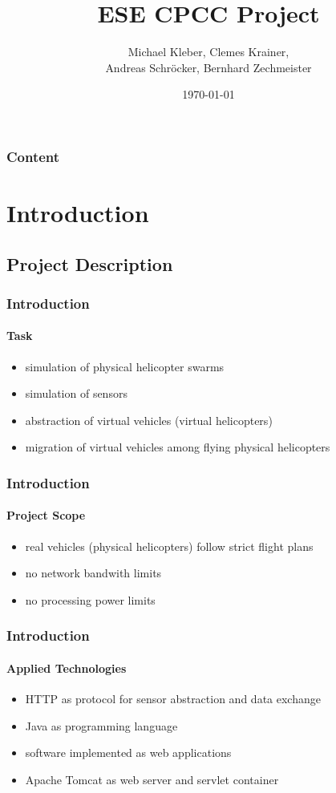 \documentclass{beamer}
\title{ESE CPCC Project}
\author[M. Kleber, C. Krainer, A. Schr\"ocker, B. Zechmeister]{Michael Kleber, Clemes Krainer,\\ Andreas Schr\"ocker, Bernhard Zechmeister}
\institute[University of Salzburg]
{
Department of Computer Sciences\\
  University of Salzburg, Austria
}
\date{\today}
\begin{document}
\begin{frame}
	\titlepage
\end{frame}

\begin{frame}
	\frametitle{Content}
	\tableofcontents
\end{frame}


\section{Introduction}

\subsection{Project Description}

\begin{frame}\frametitle{Introduction}\framesubtitle{Task}
	\begin{itemize}
		\item simulation of physical helicopter swarms
		\item simulation of sensors
		\item abstraction of virtual vehicles (virtual helicopters)
		\item migration of virtual vehicles among flying physical helicopters
	\end{itemize} 
\end{frame}

\begin{frame}\frametitle{Introduction}\framesubtitle{Project Scope}
	\begin{itemize}
		\item real vehicles (physical helicopters) follow strict flight plans
		\item no network bandwith limits
		\item no processing power limits
	\end{itemize} 
\end{frame}

\begin{frame}\frametitle{Introduction}\framesubtitle{Applied Technologies}
	\begin{itemize}
		\item HTTP as protocol for sensor abstraction and data exchange
		\item Java as programming language
		\item software implemented as web applications
		\item Apache Tomcat as web server and servlet container
	\end{itemize} 
\end{frame}
\end{document}
